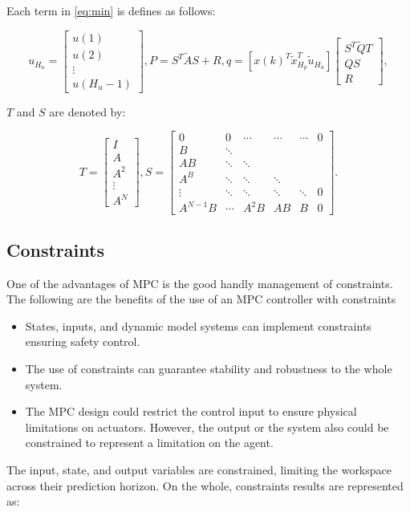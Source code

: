 Each term in \ref{eq:min} is defines as follows:

\begin{equation}
    u_{H_u} = \begin{bmatrix}
u(1) \\
u(2) \\
\vdots  \\
u(H_u-1)
\end{bmatrix}, P=S^T\tilde{A}S + R, q=\left[ x(k)^T \tilde{x}^T_{H_p} \tilde{u}_{H_u}\right]
\begin{bmatrix}
S^T \tilde{Q}T \\
QS \\
R
\end{bmatrix},
\label{eq:P_matrix}
\end{equation}

$T$ and $S$ are denoted by:

\begin{equation}
T = \begin{bmatrix}
I \\
A \\
A^2 \\
\vdots  \\
A^N
\end{bmatrix},
S= \begin{bmatrix}
0 & 0 & \cdots  & \cdots & \cdots & 0 \\
B & \ddots  &  &  &  &  \\
AB & \ddots & \ddots &  &  &  \\
A^B & \ddots & \ddots & \ddots &  &  \\
\vdots & \ddots & \ddots & \ddots & \ddots & 0 \\
A^{N-1}B & \cdots & A^2B & AB & B & 0
\end{bmatrix}.
\end{equation}


\subsection{Constraints}


One of the advantages of MPC is the good handly management of constraints. The following are the benefits of the use of an MPC controller with constraints
\begin{itemize}
    \item States, inputs, and dynamic model systems can implement constraints ensuring safety control.
    \item The use of constraints can guarantee stability and robustness to the whole system.
    \item The MPC design could restrict the control input to ensure physical limitations on actuators. However, the output or the system also could be constrained to represent a limitation on the agent.
\end{itemize}
\newline
The input, state, and output variables are constrained, limiting the workspace across their prediction horizon. On the whole, constraints results are represented as:

